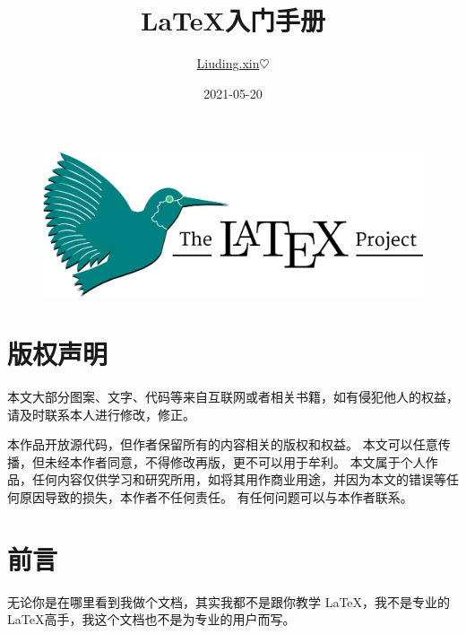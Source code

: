 \documentclass[UTF8,AutoFakeBold]{ctexart}
\numberwithin{figure}{section}
\numberwithin{table}{section}
\begin{document}
\title{ \LaTeX 入门手册}
\author{ \href{liuding.xin}{Liuding.xin}$\heartsuit$}
\date{2021-05-20}


\begin{titlepage}
    \maketitle %
    \begin{figure}[htbp]
        \centering
        \includegraphics[scale=0.4,angle=-50]{images/1200px_LaTeX_project_logo_bird.svg.png}
    \end{figure}
\end{titlepage}

\section*{版权声明}

本文大部分图案、文字、代码等来自互联网或者相关书籍，如有侵犯他人的权益，请及时联系本人进行修改，修正。

本作品开放源代码，但作者保留所有的内容相关的版权和权益。 本文可以任意传播，但未经本作者同意，不得修改再版，更不可以用于牟利。 本文属于个人作品，任何内容仅供学习和研究所用，如将其用作商业用途，并因为本文的错误等任何原因导致的损失，本作者不任何责任。 有任何问题可以与本作者联系。
\clearpage

\tableofcontents

\listoffigures

\listoftables


\clearpage

\section*{前言}

无论你是在哪里看到我做个文档，其实我都不是跟你教学 \LaTeX ，我不是专业的 \LaTeX 高手，我这个文档也不是为专业的用户而写。
\end{document}
